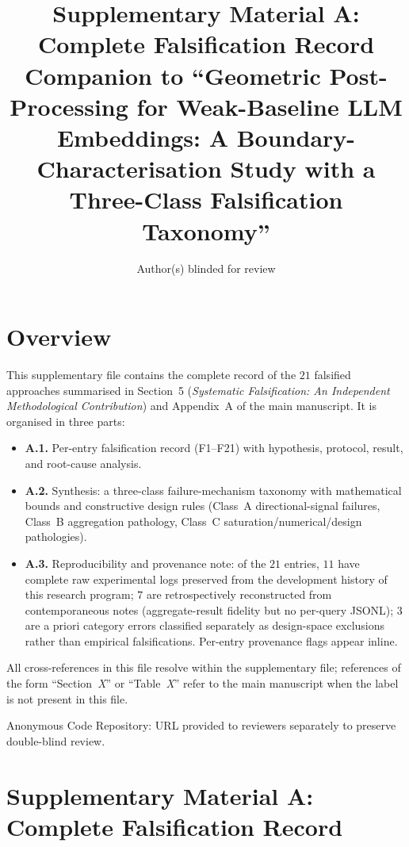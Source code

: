 \documentclass[review,1p,11pt]{elsarticle}
\begin{document}
\begin{frontmatter}
\title{Supplementary Material A: Complete Falsification Record\\
{\normalsize Companion to ``Geometric Post-Processing for Weak-Baseline LLM Embeddings: A Boundary-Characterisation Study with a Three-Class Falsification Taxonomy''}}
\author{Author(s) blinded for review}
\end{frontmatter}

\section*{Overview}

This supplementary file contains the complete record of the $21$ falsified approaches summarised in Section~5 (\emph{Systematic Falsification: An Independent Methodological Contribution}) and Appendix~A of the main manuscript. It is organised in three parts: 

\begin{itemize}[leftmargin=*]
\item \textbf{A.1.} Per-entry falsification record (F1--F21) with hypothesis, protocol, result, and root-cause analysis.
\item \textbf{A.2.} Synthesis: a three-class failure-mechanism taxonomy with mathematical bounds and constructive design rules (Class~A directional-signal failures, Class~B aggregation pathology, Class~C saturation/numerical/design pathologies).
\item \textbf{A.3.} Reproducibility and provenance note: of the $21$ entries, $11$ have complete raw experimental logs preserved from the development history of this research program; $7$ are retrospectively reconstructed from contemporaneous notes (aggregate-result fidelity but no per-query JSONL); $3$ are a priori category errors classified separately as design-space exclusions rather than empirical falsifications. Per-entry provenance flags appear inline.
\end{itemize}

All cross-references in this file resolve within the supplementary file; references of the form ``Section~\textit{X}'' or ``Table~\textit{X}'' refer to the main manuscript when the label is not present in this file.

Anonymous Code Repository: URL provided to reviewers separately to preserve double-blind review.

\section*{Supplementary Material A: Complete Falsification Record}
\label{app:falsification}
\end{document}
